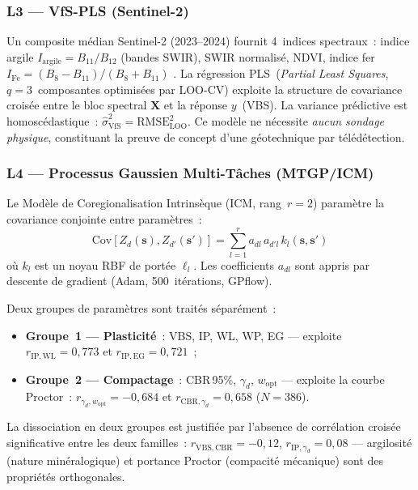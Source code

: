 \documentclass[10pt,a4paper,twocolumn]{article}
\newcommand{\bs}{\mathbf{s}}
\begin{document}
	\subsubsection{L3 --- VfS-PLS (Sentinel-2)}
	\label{subsec:vfs}
	
	Un composite médian Sentinel-2 (2023--2024) fournit 4~indices
	spectraux~: indice argile $I_{\mathrm{argile}}=B_{11}/B_{12}$
	(bandes SWIR), SWIR normalisé, NDVI, indice fer
	$I_{\mathrm{Fe}}=(B_8-B_{11})/(B_8+B_{11})$
	\cite{viscarra2006data}.
	La régression PLS~(\textit{Partial Least Squares},
	$q=3$~composantes optimisées par LOO-CV) exploite la structure
	de covariance croisée entre le bloc spectral $\mathbf{X}$ et la
	réponse $y$~(VBS). La variance prédictive est homoscédastique~:
	$\hat{\sigma}^2_{\mathrm{VfS}}=\mathrm{RMSE}^2_{\mathrm{LOO}}$.
	Ce modèle ne nécessite \emph{aucun sondage physique}, constituant
	la preuve de concept d'une géotechnique par télédétection.
	
	\subsubsection{L4 --- Processus Gaussien Multi-Tâches (MTGP/ICM)}
	\label{subsec:mtgp}
	
	Le Modèle de Coregionalisation Intrinsèque (ICM, rang~$r=2$)
	\cite{journelhijbregts1978} paramètre la covariance conjointe
	entre paramètres~:
	\begin{equation}
		\mathrm{Cov}[Z_d(\bs),Z_{d'}(\bs')]=
		\sum_{l=1}^{r}a_{dl}\,a_{d'l}\,k_l(\bs,\bs')
		\label{eq:icm}
	\end{equation}
	où $k_l$ est un noyau RBF de portée $\ell_l$.
	Les coefficients $a_{dl}$ sont appris par descente de gradient
	(Adam, 500~itérations, GPflow).
	
	Deux groupes de paramètres sont traités séparément~:
	\begin{itemize}[noitemsep]
		\item \textbf{Groupe~1 --- Plasticité}~:
		VBS, IP, WL, WP, EG --- exploite
		$r_{\mathrm{IP,WL}}=0{,}773$ et $r_{\mathrm{IP,EG}}=0{,}721$~;
		\item \textbf{Groupe~2 --- Compactage}~:
		CBR\,95\%, $\gamma_d$, $w_{\mathrm{opt}}$ --- exploite
		la courbe Proctor~: $r_{\gamma_d,w_{\mathrm{opt}}}=-0{,}684$
		et $r_{\mathrm{CBR},\gamma_d}=0{,}658$ ($N=386$).
	\end{itemize}
	
	La dissociation en deux groupes est justifiée par l'absence de
	corrélation croisée significative entre les deux familles~:
	$r_{\mathrm{VBS,CBR}}=-0{,}12$, $r_{\mathrm{IP},\gamma_d}=0{,}08$
	--- argilosité (nature minéralogique) et portance Proctor
	(compacité mécanique) sont des propriétés orthogonales.
	
\end{document}
